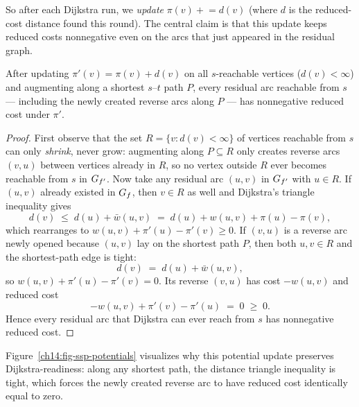 So after each Dijkstra run, we \emph{update} $\pi(v)\mathrel{+}=d(v)$ (where $d$ is the reduced-cost distance found this round). The central claim is that this update keeps reduced costs nonnegative even on the arcs that just appeared in the residual graph.

\begin{lemma}\label{ch14:lem-newarcs}
After updating $\pi'(v)=\pi(v)+d(v)$ on all $s$-reachable vertices ($d(v)<\infty$) and augmenting along a shortest $s$--$t$ path $P$, every residual arc reachable from $s$ --- including the newly created reverse arcs along $P$ --- has nonnegative reduced cost under $\pi'$.
\end{lemma}

\begin{proof}
First observe that the set $R=\{v : d(v)<\infty\}$ of vertices reachable from $s$ can only \emph{shrink}, never grow: augmenting along $P\subseteq R$ only creates reverse arcs $(v,u)$ between vertices already in $R$, so no vertex outside $R$ ever becomes reachable from $s$ in $G_{f'}$. Now take any residual arc $(u,v)$ in $G_{f'}$ with $u\in R$. If $(u,v)$ already existed in $G_f$, then $v\in R$ as well and Dijkstra's triangle inequality gives
\[
  d(v) \;\le\; d(u)+\bar w(u,v) \;=\; d(u)+w(u,v)+\pi(u)-\pi(v),
\]
which rearranges to $w(u,v)+\pi'(u)-\pi'(v)\ge 0$. If $(v,u)$ is a reverse arc newly opened because $(u,v)$ lay on the shortest path $P$, then both $u,v\in R$ and the shortest-path edge is tight:
\[
  d(v) \;=\; d(u)+\bar w(u,v),
\]
so $w(u,v)+\pi'(u)-\pi'(v)=0$. Its reverse $(v,u)$ has cost $-w(u,v)$ and reduced cost
\[
  -w(u,v)+\pi'(v)-\pi'(u) \;=\; 0 \;\ge\; 0.
\] Hence every residual arc that Dijkstra can ever reach from $s$ has nonnegative reduced cost.
\end{proof}

Figure~\ref{ch14:fig-ssp-potentials} visualizes why this potential update preserves Dijkstra-readiness: along any shortest path, the distance triangle inequality is tight, which forces the newly created reverse arc to have reduced cost identically equal to zero.


